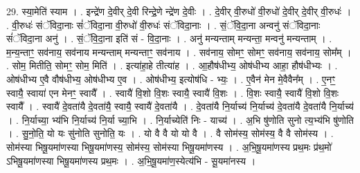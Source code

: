 \documentclass[17pt]{extarticle}
\begin{document}
29. स्या॒मेति॑ स्याम । . इन्द्रे॑ण दे॒वीर् दे॒वी रिन्द्रे॒णे न्द्रे॑ण दे॒वीः । . दे॒वीर् वी॒रुधो॑ वी॒रुधो॑ दे॒वीर् दे॒वीर् वी॒रुधः॑ । . वी॒रुधः॑ संॅविदा॒नाः सं॑ॅविदा॒ना वी॒रुधो॑ वी॒रुधः॑ संॅविदा॒नाः । . सं॒ॅवि॒दा॒ना अन्वनु॑ संॅविदा॒नाः सं॑ॅविदा॒ना अनु॑ । . सं॒ॅवि॒दा॒ना इति॑ सं - वि॒दा॒नाः । . अनु॑ मन्यन्ताम् मन्यन्ता॒ मन्वनु॑ मन्यन्ताम् । . म॒न्य॒न्ताꣳ॒॒ सव॑नाय॒ सव॑नाय मन्यन्ताम् मन्यन्ताꣳ॒॒ सव॑नाय । . सव॑नाय॒ सोमꣳ॒॒ सोमꣳ॒॒ सव॑नाय॒ सव॑नाय॒ सोम᳚म् । . सोम॒ मितीति॒ सोमꣳ॒॒ सोम॒ मिति॑ । . इत्या॑हा॒हे तीत्या॑ह । . आ॒हौष॑धीभ्य॒ ओष॑धीभ्य आहा॒ हौष॑धीभ्यः । . ओष॑धीभ्य ए॒वै वौष॑धीभ्य॒ ओष॑धीभ्य ए॒व । . ओष॑धीभ्य॒ इत्योष॑धि - भ्यः॒ । . ए॒वैन॑ मेन मे॒वैवैन᳚म् । . ए॒नꣳ॒॒ स्वायै॒ स्वाया॑ एन मेनꣳ॒॒ स्वायै᳚ । . स्वायै॑ वि॒शो वि॒शः स्वायै॒ स्वायै॑ वि॒शः । . वि॒शः स्वायै॒ स्वायै॑ वि॒शो वि॒शः स्वायै᳚ । . स्वायै॑ दे॒वता॑यै दे॒वता॑यै॒ स्वायै॒ स्वायै॑ दे॒वता॑यै । . दे॒वता॑यै नि॒र्याच्य॑ नि॒र्याच्य॑ दे॒वता॑यै दे॒वता॑यै नि॒र्याच्य॑ । . नि॒र्याच्या॒ भ्य॑भि नि॒र्याच्य॑ नि॒र्या च्या॒भि । . नि॒र्याच्येति॑ निः - याच्य॑ । . अ॒भि षु॑णोति सुनो त्य॒भ्य॑भि षु॑णोति । . सु॒नो॒ति॒ यो यः सु॑नोति सुनोति॒ यः । . यो वै वै यो यो वै । . वै सोम॑स्य॒ सोम॑स्य॒ वै वै सोम॑स्य । . सोम॑स्या भिषू॒यमा॑णस्या भिषू॒यमा॑णस्य॒ सोम॑स्य॒ सोम॑स्या भिषू॒यमा॑णस्य । . अ॒भि॒षू॒यमा॑णस्य प्रथ॒मः प्र॑थ॒मो॑ ऽभिषू॒यमा॑णस्या भिषू॒यमा॑णस्य प्रथ॒मः । . अ॒भि॒षू॒यमा॑ण॒स्येत्य॑भि - सू॒यमा॑नस्य । \newline
\end{document}
